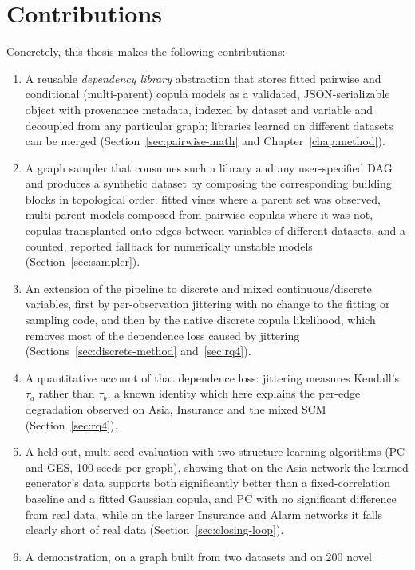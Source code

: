 \documentclass[
  english,
  class=report,
  accentcolor=2c,
  marginpar=false,
  parskip=half-,
  fontsize=11pt,
  ruledheaders=false,
  pdfa=false,
  IMRAD=false,
  thesis={type=master}
]{tudapub}
\begin{document}
\section{Contributions}
Concretely, this thesis makes the following contributions:
\begin{enumerate}
  \item A reusable \emph{dependency library} abstraction that stores fitted
    pairwise and conditional (multi-parent) copula models as a validated,
    JSON-serializable object with provenance metadata, indexed by dataset
    and variable and decoupled from any particular graph; libraries learned
    on different datasets can be merged (Section~\ref{sec:pairwise-math} and
    Chapter~\ref{chap:method}).
  \item A graph sampler that consumes such a library and any user-specified
    DAG and produces a synthetic dataset by composing the corresponding
    building blocks in topological order: fitted vines where a parent set
    was observed, multi-parent models composed from pairwise copulas where
    it was not, copulas transplanted onto edges between variables of
    different datasets, and a counted, reported fallback for numerically
    unstable models (Section~\ref{sec:sampler}).
  \item An extension of the pipeline to discrete and mixed
    continuous/discrete variables, first by per-observation jittering with
    no change to the fitting or sampling code, and then by the native
    discrete copula likelihood, which removes most of the dependence loss
    caused by jittering (Sections~\ref{sec:discrete-method}
    and~\ref{sec:rq4}).
  \item A quantitative account of that dependence loss: jittering measures
    Kendall's $\tau_a$ rather than $\tau_b$, a known identity which here
    explains the per-edge degradation observed on Asia, Insurance and the
    mixed SCM (Section~\ref{sec:rq4}).
  \item A held-out, multi-seed evaluation with two structure-learning
    algorithms (PC and GES, 100 seeds per graph), showing that on the Asia
    network the learned generator's data supports both significantly better
    than a fixed-correlation baseline and a fitted Gaussian copula, and PC
    with no significant difference from real data, while on the larger
    Insurance and Alarm networks
    it falls clearly short of real data (Section~\ref{sec:closing-loop}).
  \item A demonstration, on a graph built from two datasets and on 200 novel

\end{enumerate}
\end{document}
